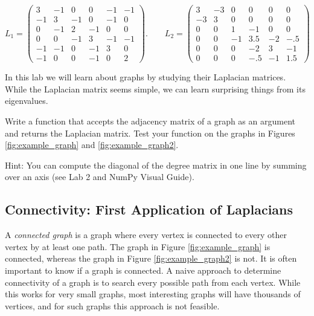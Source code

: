 \[
L_1 = \begin{pmatrix}
3 & -1 & 0 & 0 & -1 & -1\\
-1 & 3 & -1 & 0 & -1 & 0\\
0 & -1 & 2 & -1 & 0 & 0\\
0 & 0 & -1 & 3 & -1 & -1\\
-1 & -1 & 0 & -1 & 3& 0\\
-1 & 0 & 0 & -1 & 0 & 2
\end{pmatrix}. \qquad L_2 = 
 \begin{pmatrix}
3 & -3 & 0 & 0 & 0 & 0\\
-3 & 3 & 0 & 0 & 0 & 0\\
0 & 0 & 1 & -1 & 0 & 0\\
0 & 0 & -1 & 3.5 & -2 & -.5\\
0 & 0 & 0 & -2 & 3 & -1\\
0 & 0 & 0 &- .5 & -1 & 1.5
\end{pmatrix}
\]

In this lab we will learn about graphs by studying their Laplacian matrices.
While the Laplacian matrix seems simple, we can learn surprising things from its eigenvalues.


\begin{problem}
Write a function that accepts the adjacency matrix of a graph as an argument and returns the Laplacian matrix. 
Test your function on the graphs in Figures \ref{fig:example_graph} and \ref{fig:example_graph2}.

Hint: You can compute the diagonal of the degree matrix in one line by summing over an axis (see Lab 2 and NumPy Visual Guide).
\label{prob:laplacian}
\end{problem}



\subsection*{Connectivity: First Application of Laplacians}

A \emph{connected graph} is a graph where every vertex is connected to every other vertex by at least one path.
The graph in Figure \ref{fig:example_graph} is connected, whereas the graph in Figure \ref{fig:example_graph2} is not.
It is often important to know if a graph is connected.
A naive approach to determine connectivity of a graph is to search every possible path from each vertex.
While this works for very small graphs, most interesting graphs will have thousands of vertices, and for such graphs this approach is not feasible.

